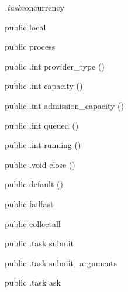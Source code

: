 \begin{CrexxClass}{\textit{.task}}{concurrency}

  \begin{Hierarchy}
  \end{Hierarchy}

  \begin{Members}

    \Factory
      {public}
      {local}
      {}

    \Factory
      {public}
      {process}
      {}

    \Method
      {public}
      {.int}
      {provider\_type}
      {()}

    \Method
      {public}
      {.int}
      {capacity}
      {()}

    \Method
      {public}
      {.int}
      {admission\_capacity}
      {()}

    \Method
      {public}
      {.int}
      {queued}
      {()}

    \Method
      {public}
      {.int}
      {running}
      {()}

    \Method
      {public}
      {.void}
      {close}
      {()}

    \Factory
      {public}
      {default}
      {()}

    \Factory
      {public}
      {failfast}
      {}

    \Factory
      {public}
      {collectall}
      {}

    \Method
      {public}
      {.task}
      {submit}
      {}

    \Method
      {public}
      {.task}
      {submit\_arguments}
      {}

    \Method
      {public}
      {.task}
      {ask}
      {}


\end{Members}
\end{CrexxClass}
